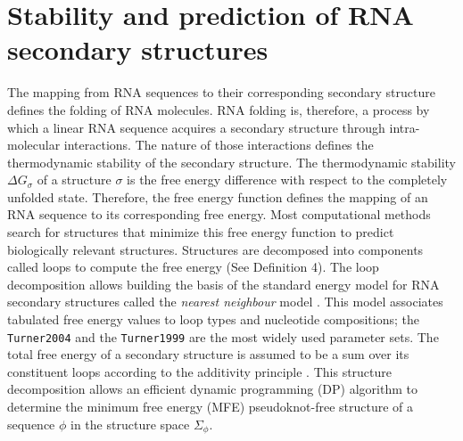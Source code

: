 \section{Stability and prediction of RNA secondary structures}

The mapping from RNA sequences to their corresponding secondary structure defines the folding of RNA molecules. RNA folding is, therefore, a process by which a linear RNA sequence acquires a secondary structure through intra-molecular interactions. The nature of those interactions defines the thermodynamic stability of the secondary structure. The thermodynamic stability $\Delta G_{\sigma}$ of a structure $\sigma$ is the free energy difference with respect to the completely unfolded state. Therefore, the free energy function defines the mapping of an RNA sequence to its corresponding free energy.
Most computational methods search for structures that minimize this free energy function to predict biologically relevant structures. Structures are decomposed into components called loops to compute the free energy (See Definition 4). The loop decomposition allows building the basis of the standard energy model for RNA secondary structures called the \textit{nearest neighbour} model \cite{turner09_nndb}. This model associates tabulated free energy values to loop types and nucleotide compositions; the \texttt{Turner2004} \cite{mathews2004incorporating}  and the \texttt{Turner1999} \cite{mathews1999expanded} are the most widely used parameter sets.  The total free energy of a secondary structure is assumed to be a sum over its constituent loops according to the additivity principle \cite{dill97_addit_princ_bioch}. This structure decomposition allows an efficient dynamic programming (DP) algorithm to determine the minimum free energy (MFE) pseudoknot-free structure of a sequence $\phi$ in the structure space $\Sigma_{\phi}$. 

